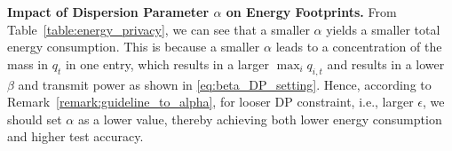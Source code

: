 \documentclass[conference,10pt]{IEEEtran}
\theoremstyle{definition}
\theoremstyle{definition}
\newcommand{\red}[1]{\textcolor{red}{[#1]}}
\begin{document}
\vspace{.3em}\noindent\textbf{Impact of Dispersion Parameter $\alpha$ on Energy Footprints.}\quad
From Table~\ref{table:energy_privacy}, we can see that a smaller $\alpha$ yields a smaller total energy consumption.
This is because a smaller $\alpha$ leads to a concentration of the mass in $q_t$ in one entry, which results in a larger $\max_{i}q_{i, t}$ and results in a lower $\beta$ and transmit power as shown in \eqref{eq:beta_DP_setting}.
Hence, according to Remark~\ref{remark:guideline_to_alpha}, for looser DP constraint, i.e., larger $\epsilon$, we should set $\alpha$ as a lower value, thereby achieving both lower energy consumption and higher test accuracy.



\end{document}
